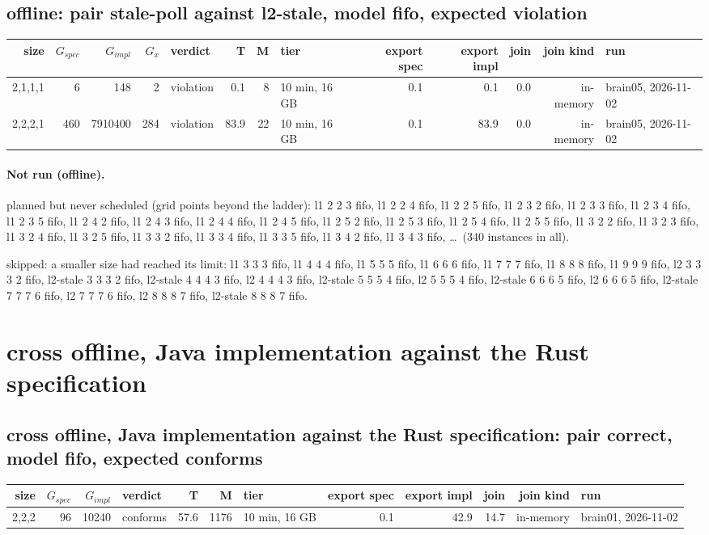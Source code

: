 \documentclass[10pt]{article}
\begin{document}
\subsection*{offline: pair \textsf{stale-poll} against \textsf{l2-stale}, model fifo, expected violation}
\begin{longtable}{@{}rrrrlrrlrrrrl@{}}
\toprule
size & $G_{\mathit{spec}}$ & $G_{\mathit{impl}}$ & $G_x$ & verdict & T & M & tier & export spec & export impl & join & join kind & run \\
\midrule
\endhead
\color{red} 2,1,1,1 & 6 & 148 & 2 & violation & 0.1 & 8 & 10 min, 16 GB & 0.1 & 0.1 & 0.0 & in-memory & brain05, 2026-11-02 \\
\color{red} 2,2,2,1 & 460 & 7910400 & 284 & violation & 83.9 & 22 & 10 min, 16 GB & 0.1 & 83.9 & 0.0 & in-memory & brain05, 2026-11-02 \\
\bottomrule
\end{longtable}
\paragraph{Not run (offline).}
planned but never scheduled (grid points beyond the ladder): l1 2 2 3 fifo, l1 2 2 4 fifo, l1 2 2 5 fifo, l1 2 3 2 fifo, l1 2 3 3 fifo, l1 2 3 4 fifo, l1 2 3 5 fifo, l1 2 4 2 fifo, l1 2 4 3 fifo, l1 2 4 4 fifo, l1 2 4 5 fifo, l1 2 5 2 fifo, l1 2 5 3 fifo, l1 2 5 4 fifo, l1 2 5 5 fifo, l1 3 2 2 fifo, l1 3 2 3 fifo, l1 3 2 4 fifo, l1 3 2 5 fifo, l1 3 3 2 fifo, l1 3 3 4 fifo, l1 3 3 5 fifo, l1 3 4 2 fifo, l1 3 4 3 fifo, \ldots\ (340 instances in all).\par
skipped: a smaller size had reached its limit: l1 3 3 3 fifo, l1 4 4 4 fifo, l1 5 5 5 fifo, l1 6 6 6 fifo, l1 7 7 7 fifo, l1 8 8 8 fifo, l1 9 9 9 fifo, l2 3 3 3 2 fifo, l2-stale 3 3 3 2 fifo, l2-stale 4 4 4 3 fifo, l2 4 4 4 3 fifo, l2-stale 5 5 5 4 fifo, l2 5 5 5 4 fifo, l2-stale 6 6 6 5 fifo, l2 6 6 6 5 fifo, l2-stale 7 7 7 6 fifo, l2 7 7 7 6 fifo, l2 8 8 8 7 fifo, l2-stale 8 8 8 7 fifo.\par
\section*{cross offline, Java implementation against the Rust specification}
\subsection*{cross offline, Java implementation against the Rust specification: pair \textsf{correct}, model fifo, expected conforms}
\begin{longtable}{@{}rrrlrrlrrrrl@{}}
\toprule
size & $G_{\mathit{spec}}$ & $G_{\mathit{impl}}$ & verdict & T & M & tier & export spec & export impl & join & join kind & run \\
\midrule
\endhead
\color{red} 2,2,2 & 96 & 10240 & conforms & 57.6 & 1176 & 10 min, 16 GB & 0.1 & 42.9 & 14.7 & in-memory & brain01, 2026-11-02 \\
\bottomrule
\end{longtable}
\end{document}
